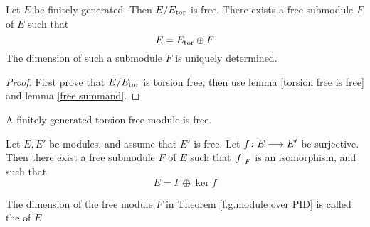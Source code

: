   \begin{thm}\label{f.g.module over PID}
    Let $E$ be finitely generated. Then $E/E_{\operatorname{tor}}$ is free. There exists a free submodule $F$ of $E$ such that
    \begin{equation*}
      E=E_{\operatorname{tor}}\oplus F
    \end{equation*}
    The dimension of such a submodule $F$ is uniquely determined.
  \end{thm}
  \begin{proof}
    First prove that $E/E_{\operatorname{tor}}$ is torsion free, then use lemma \ref{torsion free is free} and lemma \ref{free summand}.
  \end{proof}
  \begin{lem}\label{torsion free is free}
    A finitely generated torsion free module is free.
  \end{lem}
  \begin{lem}\label{free summand}
    Let $E,E'$ be modules, and assume that $E'$ is free. Let $f\colon E\longrightarrow E'$ be surjective. Then there exist a free submodule $F$ of $E$ such that $\left.{f}\right|_{F}$ is an isomorphism, and such that
    \begin{equation*}
      E=F\oplus\ker f
    \end{equation*}
  \end{lem}

  \begin{defn}
    The dimension of the free module $F$ in Theorem \ref{f.g.module over PID} is called the  of $E$.
  \end{defn}


